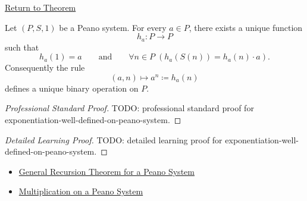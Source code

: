 \newpage
{}
\label{prf:exponentiation-well-defined-on-peano-system}

\begin{remark*}[Return]
\hyperref[thm:exponentiation-well-defined-on-peano-system]{Return to Theorem}
\end{remark*}

\begin{theorem*}
Let $(P,S,1)$ be a Peano system. For every $a \in P$, there exists a unique
function
\[
h_a:P\to P
\]
such that
\[
h_a(1)=a
\qquad\text{and}\qquad
\forall n \in P\;(h_a(S(n))=h_a(n)\cdot a).
\]
Consequently the rule
\[
(a,n)\longmapsto a^n\coloneqq h_a(n)
\]
defines a unique binary operation on $P$.
\end{theorem*}

\begin{proof}[Professional Standard Proof]
\LRAProofBodyStart
TODO: professional standard proof for exponentiation-well-defined-on-peano-system.
\end{proof}

\begin{proof}[Detailed Learning Proof]
\LRAProofBodyStart
TODO: detailed learning proof for exponentiation-well-defined-on-peano-system.
\end{proof}

\begin{remark*}
\end{remark*}

\begin{dependencies}
\begin{itemize}
  \item \hyperref[thm:general-recursion-theorem-for-peano-system]{General Recursion Theorem for a Peano System}
  \item \hyperref[def:multiplication-on-peano-system]{Multiplication on a Peano System}
\end{itemize}
\end{dependencies}

\clearpage
